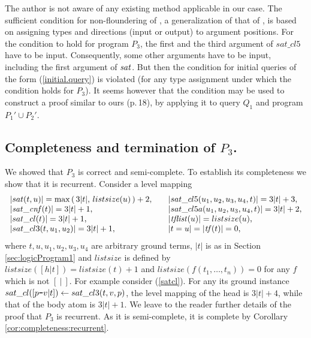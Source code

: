 \documentclass{tlp}
\newcommand*{\seq}[2][n]  {{#2_{1}, \allowbreak \ldots, \allowbreak #2_{#1}}}
\newcommand*{\mydash}{{\mbox{\tt-}}}
\begin{document}
The author is not aware of any existing method applicable in our case.
The sufficient condition for non-floundering of
\cite[Theorem 3.5]{SmausHK98.PLILP98}, a generalization of that of 
\cite{AptL95.delays}, is based on 
assigning types and directions (input or output) to argument positions.
For the condition to hold for program $P_3$,
the first and the third argument of $sat\_cl5$ have to be input.
Consequently, some other arguments have to be input, including
the first argument of ${\it sat}$.
But then the condition for initial queries of the form (\ref{initial.query})
is violated
(for any type assignment under which the condition holds for $P_3$).
It seems however that
the condition may be used to construct a proof similar to ours (p.\,18), by 
applying it to query $Q_1$ and program  $P_1'\cup P_2'$.




\subsection{Completeness and termination of $P_3$.}
We showed that  $P_3$ is correct and semi-complete.
To establish its completeness we show that it is recurrent.
Consider a level mapping
\[
\begin{array}{l}
|sat(t,u) | = \max\left(\, 3|t|,\,list size(u)\, \right) + 2,    \\
  | {\it sat\_c n f}(t) | = 3|t|+1, \\
    | sat\_cl(t)| = 3|t|+1,  \\
| sat\_cl3(t,u_1,u_2)| = 3|t|+1,  \\
\end{array}
\quad
\begin{array}{l}
| sat\_cl5(u_1,u_2,u_3,u_4,t)| = 3|t|+3,  \\
| sat\_cl5a(u_1,u_2,u_3,u_4,t)| = 3|t|+2,  \\
| {\it t f list}(u) |      = list size(u), \\
 |t=u| = | {\it t f}(t) | = 0,
\end{array}
\]
where $t,u,u_1,u_2,u_3,u_4$ are arbitrary ground terms,
$|t|$ is as in Section \ref{sec:logicProgram1}
and $list size$ is defined by
$list size([h|t])=list size(t)+1$ and 
$list size(f(\seq t))=0$ for any $f$ which is not $[\ | \ ]$.
For example consider (\ref{satcl}).  For any its ground instance
$sat\_cl([p\mydash v|t])\gets sat\_cl3(t,v,p)$,
the level mapping of the head is $3|t|+4$, while that of the body atom is
$3|t|+1$.  We leave to the reader further details of the proof that $P_3$ is
recurrent. 
As it is semi-complete, it is complete by  Corollary \ref{cor:completeness:recurrent}.
\end{document}
